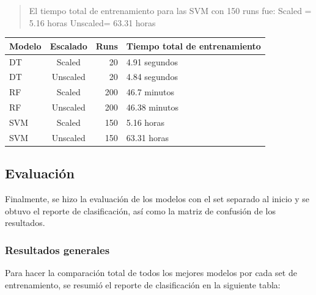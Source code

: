 \documentclass[
  10pt,
]{article}
\newcounter{none} %
\begin{document}
\begin{quote}
El tiempo total de entrenamiento para las SVM con 150 runs fue: Scaled =
5.16 horas Unscaled= 63.31 horas
\end{quote}

{\def\LTcaptype{none} %
\begin{longtable}[]{@{}lcrl@{}}
\toprule\noalign{}
Modelo & Escalado & Runs & Tiempo total de entrenamiento \\
\midrule\noalign{}
\endhead
\bottomrule\noalign{}
\endlastfoot
DT & Scaled & 20 & 4.91 segundos \\
DT & Unscaled & 20 & 4.84 segundos \\
RF & Scaled & 200 & 46.7 minutos \\
RF & Unscaled & 200 & 46.38 minutos \\
SVM & Scaled & 150 & 5.16 horas \\
SVM & Unscaled & 150 & 63.31 horas \\
\end{longtable}
}

\subsection{Evaluación}\label{evaluaciuxf3n}

Finalmente, se hizo la evaluación de los modelos con el set separado al
inicio y se obtuvo el reporte de clasificación, así como la matriz de
confusión de los resultados.

\subsubsection{Resultados generales}\label{resultados-generales}

Para hacer la comparación total de todos los mejores modelos por cada
set de entrenamiento, se resumió el reporte de clasificación en la
siguiente tabla:
\end{document}
